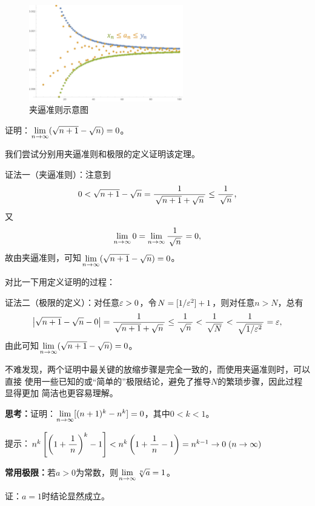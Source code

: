 \begin{figure}[h]
	\centering
	\includegraphics[width=0.6\textwidth]{./Images/Ch01/xnanyn.pdf}
	\caption{夹逼准则示意图}
	\label{fig:xnanyn}
\end{figure}

\bs

\egz 证明：$\lim\limits_{n\to\infty} (\sqrt{n+1}-\sqrt{n})=0$。

我们尝试分别用夹逼准则和极限的定义证明该定理。

证法一（夹逼准则）：注意到
$$0<\sqrt{n+1}-\sqrt{n}={\displaystyle\frac{\,{1}\,}{\,{\sqrt{n+1}+\sqrt{n}}\,}
\leq\displaystyle\frac{\,{1}\,}{\,{\sqrt{n}}\,}},$$
又
$$\lim\limits_{n\to\infty} 0=\lim\limits_{n\to\infty}\displaystyle\frac{\,{1}\,}{\,{\sqrt{n}}\,}=0,$$
故由夹逼准则，可知$\lim\limits_{n\to\infty} (\sqrt{n+1}-\sqrt{n})=0$。\fin

对比一下用定义证明的过程：

证法二（极限的定义）：对任意$\varepsilon>0$，令$N=[1/\varepsilon^2]+1$，则对任意$n>N$，总有
$$\left|\sqrt{n+1}-\sqrt{n}-0\right|
={\displaystyle\frac{\,{1}\,}{\,{\sqrt{n+1}+\sqrt{n}}\,}\leq\displaystyle\frac{\,{1}\,}{\,{\sqrt{n}}\,}}
<\displaystyle\frac{\,{1}\,}{\,{\sqrt{N}}\,}<\displaystyle\frac{\,{1}\,}{\,{\sqrt{1/\varepsilon^2}}\,}=\varepsilon,$$
由此可知$\lim\limits_{n\to\infty} (\sqrt{n+1}-\sqrt{n})=0$。\fin

不难发现，两个证明中最关键的放缩步骤是完全一致的，而使用夹逼准则时，可以直接
使用一些已知的或“简单的”极限结论，避免了推导$N$的繁琐步骤，因此过程显得更加
简洁也更容易理解。

\bs
{\bf 思考：}证明：$\lim\limits_{n\to\infty} [(n+1)^k-{n}^k]=0$，其中$0<k<1$。

\ifhint
提示：$n^k\left[\left(1+\displaystyle\frac{\,{1}\,}{\,{n}\,}\right)^k-1\right]
<n^k\left(1+\displaystyle\frac{\,{1}\,}{\,{n}\,}-1\right)=n^{k-1}\to 0\;(n\to\infty)$
\fi

\bs
\begin{thx}
	{\bf 常用极限：}若$a>0$为常数，则$\lim\limits_{n\to\infty} \sqrt[n]{a}=1$。
\end{thx}
证：$a=1$时结论显然成立。

